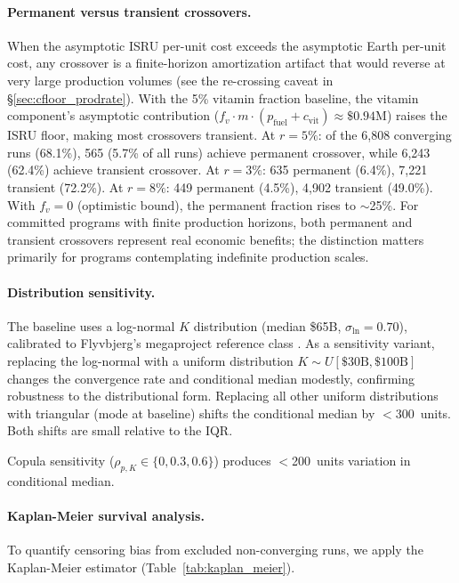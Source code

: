 \documentclass[preprint,12pt]{elsarticle}
\begin{document}
\paragraph{Permanent versus transient crossovers.} When the asymptotic ISRU per-unit cost exceeds the asymptotic Earth per-unit cost, any crossover is a finite-horizon amortization artifact that would reverse at very large production volumes (see the re-crossing caveat in \S\ref{sec:cfloor_prodrate}). With the 5\% vitamin fraction baseline, the vitamin component's asymptotic contribution ($f_v \cdot m \cdot (p_{\mathrm{fuel}} + c_{\mathrm{vit}}) \approx \$0.94$M) raises the ISRU floor, making most crossovers transient. At $r = 5\%$: of the 6{,}808 converging runs (68.1\%), 565 (5.7\% of all runs) achieve permanent crossover, while 6{,}243 (62.4\%) achieve transient crossover. At $r = 3\%$: 635 permanent (6.4\%), 7{,}221 transient (72.2\%). At $r = 8\%$: 449 permanent (4.5\%), 4{,}902 transient (49.0\%). With $f_v = 0$ (optimistic bound), the permanent fraction rises to $\sim$25\%. For committed programs with finite production horizons, both permanent and transient crossovers represent real economic benefits; the distinction matters primarily for programs contemplating indefinite production scales.

\paragraph{Distribution sensitivity.} The baseline uses a log-normal $K$ distribution (median \$65B, $\sigma_{\ln} = 0.70$), calibrated to Flyvbjerg's megaproject reference class \cite{flyvbjerg2014}. As a sensitivity variant, replacing the log-normal with a uniform distribution $K \sim U[\$30\text{B}, \$100\text{B}]$ changes the convergence rate and conditional median modestly, confirming robustness to the distributional form. Replacing all other uniform distributions with triangular (mode at baseline) shifts the conditional median by $<$300~units. Both shifts are small relative to the IQR.

Copula sensitivity ($\rho_{p,K} \in \{0, 0.3, 0.6\}$) produces $<$200~units variation in conditional median.

\paragraph{Kaplan-Meier survival analysis.} To quantify censoring bias from excluded non-converging runs, we apply the Kaplan-Meier estimator \cite{kaplan1958} (Table~\ref{tab:kaplan_meier}).
\end{document}
